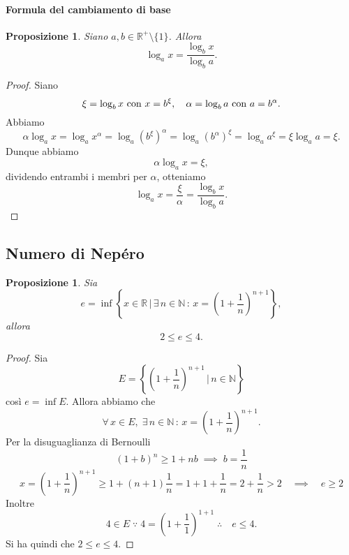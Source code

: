 \documentclass{article}
\theoremstyle{plain}
\newtheorem{prop}[thm]{Proposizione}
\theoremstyle{definition}
\theoremstyle{remark}
\begin{document}
\paragraph{Formula del cambiamento di base}
\begin{bxthm}
\begin{prop}
    Siano $a,b\in\mathbb{R}^+\setminus\{1\}$. Allora
    \[\log_ax=\frac{\log_bx}{\log_ba}.\]
\end{prop}
\end{bxthm}
\begin{proof}
    Siano \[\xi=\log_bx\textup{ con } x=b^\xi,\quad\alpha=\log_ba\textup{ con } a=b^\alpha.\]
    Abbiamo \[\alpha\log_ax=\log_ax^\alpha=\log_a(b^\xi)^\alpha=\log_a(b^\alpha)^\xi=\log_aa^\xi=\xi\log_aa=\xi.\]
    Dunque abbiamo \[\alpha\log_ax=\xi,\]
    dividendo entrambi i membri per $\alpha$, otteniamo 
    \[\log_ax=\frac{\xi}{\alpha}=\frac{\log_bx}{\log_ba}.\]
\end{proof}

\vspace{10pt}

\subsection{Numero di Nepéro}

\vspace{10pt}

\begin{bxthm}
\begin{prop}
    Sia
    \[e=\inf\left\{x\in\mathbb{R}\,|\,\exists\,n\in\mathbb{N}\,:\,x=\left(1+\dfrac{1}{n}\right)^{n+1}\right\},\]
    allora 
    \[2\leq e\leq 4.\]
\end{prop}
\end{bxthm}
\begin{proof}
    Sia \[E=\left\{\left(1+\dfrac{1}{n}\right)^{n+1}\,|\,n\in\mathbb{N}\right\}\] così $e=\inf E$.
    Allora abbiamo che \[\forall\,x\in E,\;\exists\,n\in\mathbb{N}\,:\,x=\left(1+\dfrac{1}{n}\right)^{n+1}.\]
    Per la disuguaglianza di Bernoulli 
    \[(1+b)^n\geq1+nb\;\implies\; b=\dfrac{1}{n}\]
    \[x=\left(1+\dfrac{1}{n}\right)^{n+1}\geq 1+(n+1)\dfrac{1}{n} = 1+1+\dfrac{1}{n} = 2+\dfrac{1}{n}>2\quad\implies\quad e\geq 2\]
    Inoltre \[4\in E \;\because\;4=\left(1+\dfrac{1}{1}\right)^{1+1}\;\therefore\quad e\leq 4.\]
    Si ha quindi che $2\leq e\leq 4$.
\end{proof}

\vspace{10pt}
\end{document}
